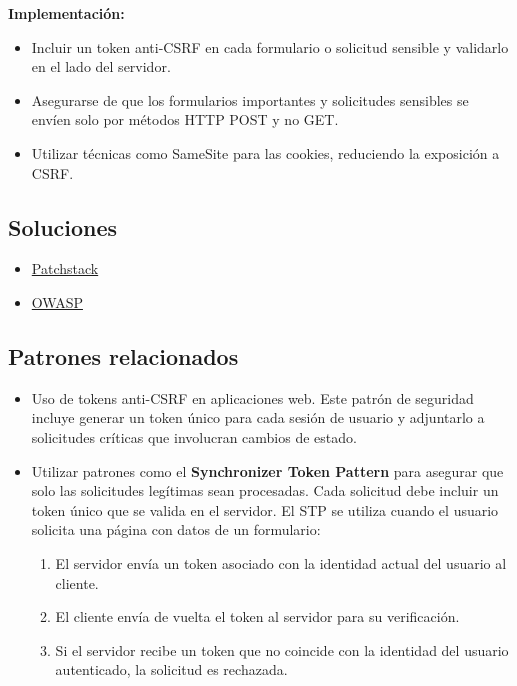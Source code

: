 \textbf{Implementación:} \begin{itemize} \item Incluir un token anti-CSRF en cada formulario o solicitud sensible y validarlo en el lado del servidor. \item Asegurarse de que los formularios importantes y solicitudes sensibles se envíen solo por métodos HTTP POST y no GET. \item Utilizar técnicas como SameSite para las cookies, reduciendo la exposición a CSRF. \end{itemize}

\subsection{Soluciones}

\begin{itemize}
    \item \href{https://patchstack.com/academy/wordpress/securing-code/cross-site-request-forgery/}{Patchstack}
    \item \href{https://cheatsheetseries.owasp.org/cheatsheets/Cross-Site_Request_Forgery_Prevention_Cheat_Sheet.html}{OWASP}
\end{itemize}

\subsection{Patrones relacionados}

\begin{itemize}
    \item Uso de tokens anti-CSRF en aplicaciones web. Este patrón de seguridad incluye generar un token único para cada sesión de usuario y adjuntarlo a solicitudes críticas que involucran cambios de estado.
    \item Utilizar patrones como el \textbf{Synchronizer Token Pattern} para asegurar que solo las solicitudes legítimas sean procesadas. Cada solicitud debe incluir un token único que se valida en el servidor. El STP se utiliza cuando el usuario solicita una página con datos de un formulario:
    \begin{enumerate}
        \item El servidor envía un token asociado con la identidad actual del usuario al cliente.
        \item El cliente envía de vuelta el token al servidor para su verificación.
        \item Si el servidor recibe un token que no coincide con la identidad del usuario autenticado, la solicitud es rechazada.
    \end{enumerate}
\end{itemize}



